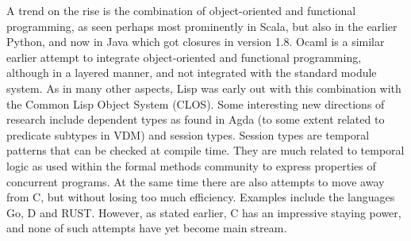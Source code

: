 A trend on the rise is the combination of object-oriented 
and functional programming, as seen perhaps most prominently in
Scala, but also in the earlier Python, and now in Java which got 
closures in version 1.8.  Ocaml is a similar earlier attempt to 
integrate object-oriented and functional programming, although in a 
layered manner, and not integrated with the standard module system. 
As in many other aspects, Lisp was early out
with this combination with the Common Lisp Object System (CLOS).
Some interesting new directions of research include dependent types 
as found in Agda (to some extent related to predicate subtypes in 
VDM) and session types. Session types are temporal patterns that 
can be checked at compile time. They are much related to temporal 
logic as used within the formal methods community to express 
properties of concurrent programs. At the same time there are also 
attempts to move away from C, but without 
losing too much efficiency. Examples include the languages Go, D and RUST. However, as stated earlier, C has an impressive staying power, and none of
such attempts have yet become main stream.

